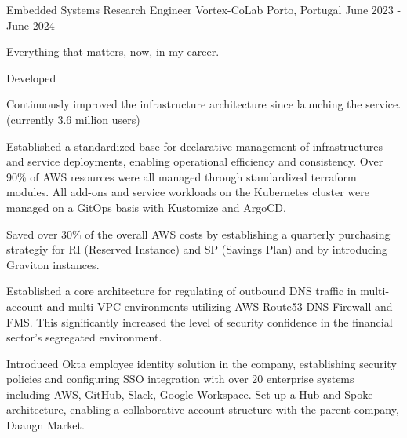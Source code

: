 

\begin{cventries}

  \cventry
    {Embedded Systems Research Engineer} %
    {Vortex-CoLab} %
    {Porto, Portugal} %
    {June 2023 - June 2024} %
    {
      \begin{cvitems} %
        \item {Everything that matters, now, in my career.}
        \item {Developed}
        \item {Continuously improved the infrastructure architecture since launching the service. (currently 3.6 million users)}
        \item {Established a standardized base for declarative management of infrastructures and service deployments, enabling operational efficiency and consistency. Over 90\% of AWS resources were all managed through standardized terraform modules. All add-ons and service workloads on the Kubernetes cluster were managed on a GitOps basis with Kustomize and ArgoCD.}
        \item {Saved over 30\% of the overall AWS costs by establishing a quarterly purchasing strategiy for RI (Reserved Instance) and SP (Savings Plan) and by introducing Graviton instances.}
        \item {Established a core architecture for regulating of outbound DNS traffic in multi-account and multi-VPC environments utilizing AWS Route53 DNS Firewall and FMS. This significantly increased the level of security confidence in the financial sector's segregated environment.}
        \item {Introduced Okta employee identity solution in the company, establishing security policies and configuring SSO integration with over 20 enterprise systems including AWS, GitHub, Slack, Google Workspace. Set up a Hub and Spoke architecture, enabling a collaborative account structure with the parent company, Daangn Market.}
      \end{cvitems}
    }


\end{cventries}
